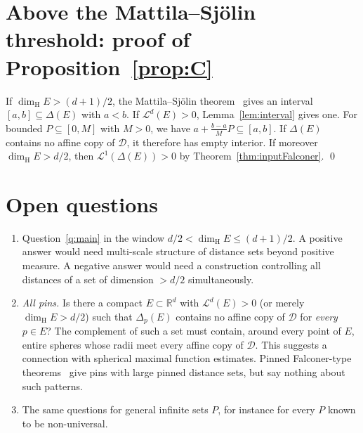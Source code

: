\documentclass[11pt]{amsart}
\theoremstyle{definition}
\theoremstyle{remark}
\newcommand{\R}{\mathbb{R}}
\newcommand{\dimH}{\dim_{\mathrm H}}
\newcommand{\Lm}{\mathcal{L}}
\newcommand{\Dy}{\mathcal{D}}
\begin{document}
\section{Above the Mattila--Sj\"olin threshold: proof of Proposition~\ref{prop:C}}

If $\dimH E>(d+1)/2$, the Mattila--Sj\"olin theorem~\cite{MattilaSjolin1999} gives an interval
$[a,b]\subseteq\Delta(E)$ with $a<b$. If $\Lm^d(E)>0$, Lemma~\ref{lem:interval} gives one. For bounded
$P\subseteq[0,M]$ with $M>0$, we have $a+\frac{b-a}{M}P\subseteq[a,b]$. If $\Delta(E)$ contains no affine copy of
$\Dy$, it therefore has empty interior. If moreover $\dimH E>d/2$, then $\Lm^1(\Delta(E))>0$ by
Theorem~\ref{thm:inputFalconer}. \qed

\section{Open questions}\label{sec:open}
\begin{enumerate}[leftmargin=*]
\item Question~\ref{q:main} in the window $d/2<\dimH E\le(d+1)/2$. A positive answer would need
  multi-scale structure of distance sets beyond positive measure. A negative answer would need a
  construction controlling all distances of a set of dimension $>d/2$ simultaneously.
\item \emph{All pins.} Is there a compact $E\subset\R^d$ with $\Lm^d(E)>0$ (or merely $\dimH E>d/2$)
  such that $\Delta_p(E)$ contains no affine copy of $\Dy$ for \emph{every} $p\in E$? The complement
  of such a set must contain, around every point of $E$, entire spheres whose radii meet every
  affine copy of $\Dy$. This suggests a connection with spherical maximal function estimates.
  Pinned Falconer-type theorems~\cite{PeresSchlag2000,GIOW2020} give pins with large pinned distance sets,
  but say nothing about such patterns.
\item The same questions for general infinite sets $P$, for instance for every $P$ known to be
  non-universal.
\end{enumerate}
\end{document}
